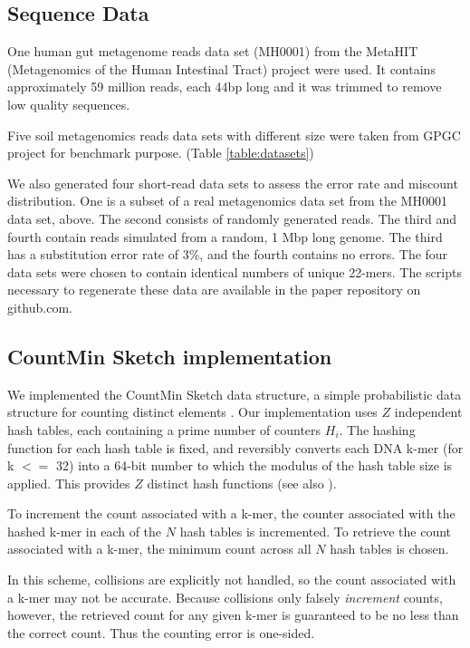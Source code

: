 \documentclass{article}
\begin{document}
\subsection{Sequence Data}

One human gut metagenome reads data set (MH0001) from the 
MetaHIT (Metagenomics of the Human Intestinal Tract) project\cite{Qin2010} were used. 
It contains approximately 59 million reads, each 44bp long and it was trimmed to remove low quality sequences. 

Five soil metagenomics reads data sets with different size were taken
from GPGC project for benchmark purpose.
(Table \ref{table:datasets})

We also generated four short-read data sets to assess the error
rate and miscount distribution. One is a subset of a real
metagenomics data set from the MH0001 data set, above. The second
consists of randomly generated reads. The third and fourth contain
reads simulated from a random, 1 Mbp long genome.  The third has a
substitution error rate of 3\%, and the fourth contains no errors. The
four data sets were chosen to contain identical numbers of unique
22-mers.  The scripts necessary to regenerate these data are available
in the paper repository on github.com.


\subsection{CountMin Sketch implementation}

We implemented the CountMin Sketch data structure, a simple
probabilistic data structure for counting distinct elements
\cite{Cormode2005}.  Our implementation uses $Z$ independent hash
tables, each containing a prime number of counters $H_i$.  The hashing
function for each hash table is fixed, and reversibly converts each
DNA k-mer (for k $<=$ 32) into a 64-bit number to which the modulus of
the hash table size is applied.  This provides $Z$ distinct hash
functions (see also \cite{adina2013}).

To increment the count associated with a k-mer, the counter associated
with the hashed k-mer in each of the $N$ hash tables is incremented.
To retrieve the count associated with a k-mer, the minimum count
across all $N$ hash tables is chosen.

In this scheme, collisions are explicitly not handled, so the count
associated with a k-mer may not be accurate. Because collisions only
falsely {\em increment} counts, however, the retrieved count for any
given k-mer is guaranteed to be no less than the correct count.  Thus
the counting error is one-sided.
\end{document}
